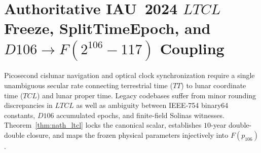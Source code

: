 \documentclass[11pt,a4paper,reqno]{article}
\def\texttt#1{#1}%
\def\mathrm#1{#1}%
\def\mathbb#1{#1}%
\def\F#1{F(#1)}%
\def\Done{D106}%
\def\LTCL{LTCL}%
\theoremstyle{plain}
\theoremstyle{definition}
\theoremstyle{remark}
\numberwithin{equation}{section}
\numberwithin{table}{section}
\newcommand{\F}[1]{\mathbb{F}_{#1}}
\newcommand{\Done}{\mathbb{D}_{106}}
\newcommand{\LTCL}{L_{\mathrm{TCL}}}
\begin{document}
\section{\texorpdfstring{Authoritative IAU~2024 $\LTCL$ Freeze, \texttt{SplitTimeEpoch}, and $\Done \to \F{2^{106}-117}$ Coupling}{Authoritative IAU 2024 LTCL Freeze, SplitTimeEpoch, and D106 to F106 Coupling}}
\label{sec:ltcl_d106}

Picosecond cislunar navigation and optical clock synchronization require a single unambiguous secular rate connecting terrestrial time ($\mathrm{TT}$) to lunar coordinate time ($\mathrm{TCL}$) and lunar proper time. Legacy codebases suffer from minor rounding discrepancies in $\LTCL$ as well as ambiguity between IEEE-754 \texttt{binary64} constants, $\Done$ accumulated epochs, and finite-field Solinas witnesses. Theorem~\ref{thm:nath_ltcl} locks the canonical scalar, establishes $10$-year double-double closure, and maps the frozen physical parameters injectively into $\F{p_{106}}$.
\end{document}
